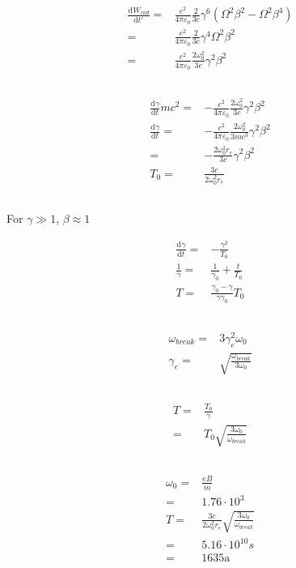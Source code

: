\documentclass[10pt,fleqn]{article}
\newcommand{\ud}{\mathrm{d}}
\newcommand{\eqar}[1]
{
  \begin{align*}
    #1
  \end{align*}
}
\newcommand{\paren}[1]{{\left({#1}\right)}}
\newcommand{\diff}[3][{}]{{\frac{\ud^{#1} {#2}}{\ud {#3}{}^{#1}}}}
\begin{document}
\section{}
\subsection{}
\eqar{
  \diff{W_{rad}}{t'}=&\frac{e^2}{4\pi\varepsilon_0}\frac{2}{3c}\gamma^6\paren{\Omega^2\beta^2-\Omega^2\beta^4}\\
  =&\frac{e^2}{4\pi\varepsilon_0}\frac{2}{3c}\gamma^4\Omega^2\beta^2\\
  =&\frac{e^2}{4\pi\varepsilon_0}\frac{2\omega_0^2}{3c}\gamma^2\beta^2
}
\subsection{}
\eqar{
  \diff{\gamma}{t}mc^2=&-\frac{e^2}{4\pi\varepsilon_0}\frac{2\omega_0^2}{3c}\gamma^2\beta^2\\
  \diff{\gamma}{t}=&-\frac{e^2}{4\pi\varepsilon_0}\frac{2\omega_0^2}{3mc^3}\gamma^2\beta^2\\
  =&-\frac{2\omega_0^2r_e}{3c}\gamma^2\beta^2\\
  T_0=&\frac{3c}{2\omega_0^2r_e}
}
\subsection{}
For $\gamma\gg1$, $\beta\approx1$
\eqar{
  \diff{\gamma}{t}=&-\frac{\gamma^2}{T_0}\\
  \frac{1}{\gamma}=&\frac{1}{\gamma_0}+\frac{t}{T_0}\\
  T=&\frac{\gamma_0 - \gamma}{\gamma\gamma_0}T_0
}
\subsection{}
\eqar{
  \omega_{break}=&3\gamma_e^2\omega_0\\
  \gamma_e=&\sqrt{\frac{\omega_{break}}{3\omega_0}}
}
\subsection{}
\eqar{
  T=&\frac{T_0}{\gamma}\\
  =&T_0\sqrt{\frac{3\omega_0}{\omega_{break}}}
}
\subsection{}
\eqar{
  \omega_0=&\frac{eB}{m}\\
  =&1.76\cdot10^3\\
  T=&\frac{3c}{2\omega_0^2r_e}\sqrt{\frac{3\omega_0}{\omega_{break}}}\\
  =&5.16\cdot10^{10}s\\
  =&1635\text{a}
}
\end{document}
